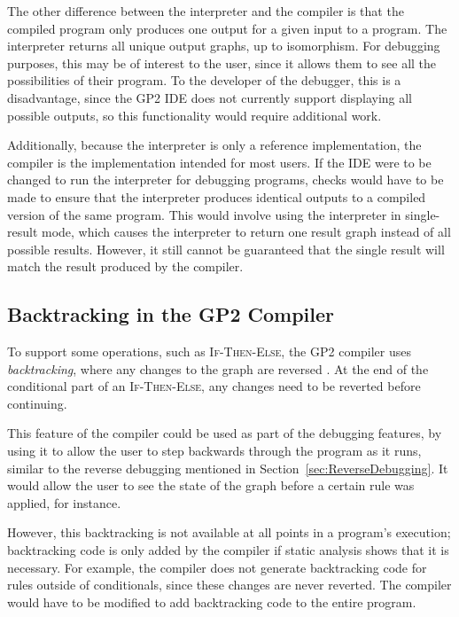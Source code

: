 \documentclass[authoryearcitations]{UoYCSproject}
\begin{document}
The other difference between the interpreter and the compiler is that the compiled
program only produces one output for a given input to a program. The interpreter
returns all unique output graphs, up to isomorphism. For debugging purposes, this
may be of interest to the user, since it allows them to see all the possibilities
of their program. To the developer of the debugger, this is a disadvantage, since
the GP2 IDE does not currently support displaying all possible outputs, so this
functionality would require additional work.

Additionally, because the interpreter is only a reference implementation, the
compiler is the implementation intended for most users. If the IDE were to be
changed to run the interpreter for debugging programs, checks would have to be
made to ensure that the interpreter produces identical outputs to a compiled
version of the same program. This would involve using the interpreter in
single-result mode, which causes the interpreter to return one result graph
instead of all possible results. However, it still cannot be guaranteed that
the single result will match the result produced by the compiler.


\subsection{Backtracking in the GP2 Compiler}
\label{sec:BacktrackingInTheGP2Compiler}

To support some operations, such as \textsc{If-Then-Else}, the GP2 compiler uses
\emph{backtracking}, where any changes to the graph are reversed \citep[ch. 5.8]{bak2015}.
At the end of the conditional part of an \textsc{If-Then-Else}, any changes need
to be reverted before continuing.

This feature of the compiler could be used as part of the debugging features,
by using it to allow the user to step backwards through the program as it runs,
similar to the reverse debugging mentioned in Section~\ref{sec:ReverseDebugging}.
It would allow the user to see the state of the graph before a certain rule was
applied, for instance.

However, this backtracking is not available at all points in a program's
execution; backtracking code is only added by the compiler if static analysis
shows that it is necessary. For example, the compiler does not generate backtracking
code for rules outside of conditionals, since these changes are never reverted.
The compiler would have to be modified to add backtracking code to the entire
program.
\end{document}
